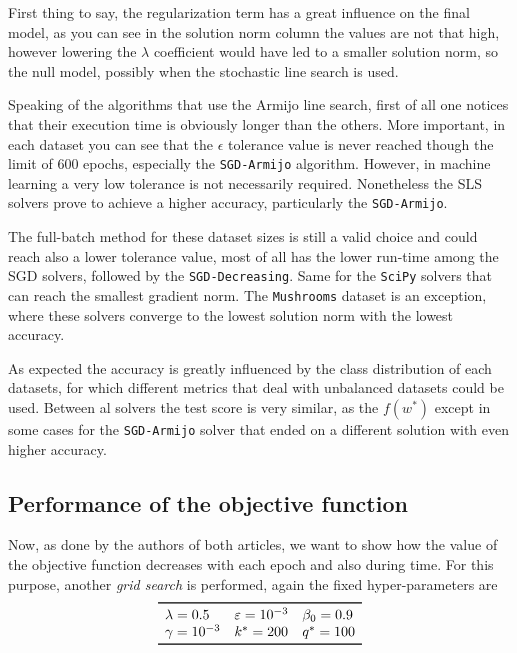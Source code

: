 


First thing to say, the regularization term has a great influence on the final model, as you can see in the solution norm column the values are not that high, however lowering the $\lambda$ coefficient would have led to a smaller solution norm, so the null model, possibly when the stochastic line search is used.

Speaking of the algorithms that use the Armijo line search, first of all one notices that their execution time is obviously longer than the others. More important, in each dataset you can see that the $\epsilon$ tolerance value is never reached though the limit of 600 epochs, especially the \texttt{SGD-Armijo} algorithm. However, in machine learning a very low tolerance is not necessarily required. Nonetheless the SLS solvers prove to achieve a higher accuracy, particularly the \texttt{SGD-Armijo}.

The full-batch method for these dataset sizes is still a valid choice and could reach also a lower tolerance value, most of all has the lower run-time among the SGD solvers, followed by the \texttt{SGD-Decreasing}. Same for the \texttt{SciPy} solvers that can reach the smallest gradient norm. The \texttt{Mushrooms} dataset is an exception, where these solvers converge to the lowest solution norm with the lowest accuracy.

As expected the accuracy is greatly influenced by the class distribution of each datasets, for which different metrics that deal with unbalanced datasets could be used. Between al solvers the test score is very similar, as the $f(w^\ast)$ except in some cases for the \texttt{SGD-Armijo} solver that ended on a different solution with even higher accuracy.

\subsection{Performance of the objective function}

Now, as done by the authors of both articles, we want to show how the value of the objective function decreases with each epoch and also during time. For this purpose, another \emph{grid search} is performed, again the fixed hyper-parameters are
\[
\begin{array}{lll}
\toprule
\lambda=0.5 & \epsilon=\num{e-3} & \beta_0=0.9 \\
\gamma=\num{e-3} & k^\ast=200 & q^\ast=100 \\
\bottomrule
\end{array}
\]

